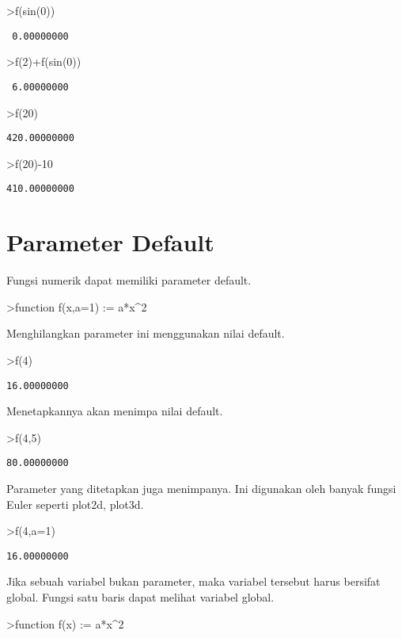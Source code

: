 \documentclass[
]{book}
\begin{document}
\textgreater f(sin(0))

\begin{verbatim}
 0.00000000 
\end{verbatim}

\textgreater f(2)+f(sin(0))

\begin{verbatim}
 6.00000000 
\end{verbatim}

\textgreater f(20)

\begin{verbatim}
420.00000000 
\end{verbatim}

\textgreater f(20)-10

\begin{verbatim}
410.00000000 
\end{verbatim}

\section{Parameter Default}\label{parameter-default}

Fungsi numerik dapat memiliki parameter default.

\textgreater function f(x,a=1) := a*x\^{}2

Menghilangkan parameter ini menggunakan nilai default.

\textgreater f(4)

\begin{verbatim}
16.00000000 
\end{verbatim}

Menetapkannya akan menimpa nilai default.

\textgreater f(4,5)

\begin{verbatim}
80.00000000 
\end{verbatim}

Parameter yang ditetapkan juga menimpanya. Ini digunakan oleh banyak fungsi Euler seperti plot2d, plot3d.

\textgreater f(4,a=1)

\begin{verbatim}
16.00000000 
\end{verbatim}

Jika sebuah variabel bukan parameter, maka variabel tersebut harus bersifat global. Fungsi satu baris dapat melihat variabel global.

\textgreater function f(x) := a*x\^{}2
\end{document}
